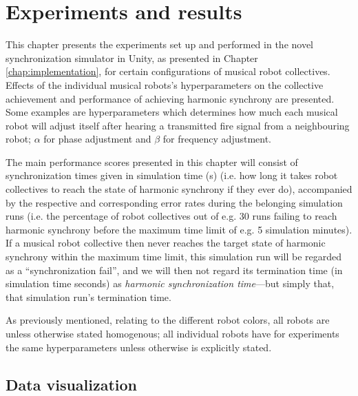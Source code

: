 \chapter{Experiments and results}
\label{chap:experiments_and_results}






This chapter presents the experiments set up and performed in the novel synchronization simulator in Unity, as presented in Chapter \ref{chap:implementation}, for certain configurations of musical robot collectives. Effects of the individual musical robots's hyperparameters on the collective achievement and performance of achieving harmonic synchrony are presented. Some examples are hyperparameters which determines how much each musical robot will adjust itself after hearing a transmitted fire signal from a neighbouring robot; $\alpha$ for phase adjustment and $\beta$ for frequency adjustment.

The main performance scores presented in this chapter will consist of synchronization times given in simulation time (s) (i.e. how long it takes robot collectives to reach the state of harmonic synchrony if they ever do), accompanied by the respective and corresponding error rates during the belonging simulation runs (i.e. the percentage of robot collectives out of e.g. 30 runs failing to reach harmonic synchrony before the maximum time limit of e.g. 5 simulation minutes). If a musical robot collective then never reaches the target state of harmonic synchrony within the maximum time limit, this simulation run will be regarded as a ``synchronization fail'', and we will then not regard its termination time (in simulation time seconds) as \textit{harmonic synchronization time}—but simply that, that simulation run's termination time.

As previously mentioned, relating to the different robot colors, all robots are unless otherwise stated homogenous; all individual robots have for experiments the same hyperparameters unless otherwise is explicitly stated.



\section{Data visualization}

